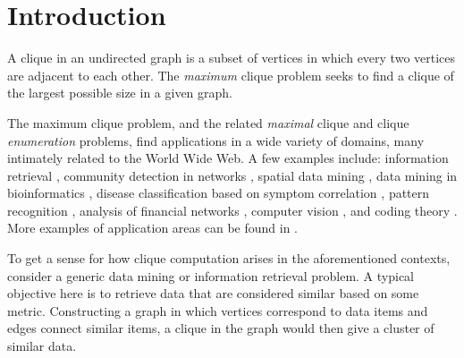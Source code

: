 \section{Introduction}
\label{sec:intro}

A clique in an undirected graph is a subset of vertices in which every two vertices
are adjacent to each other. The {\em maximum} clique problem seeks to find 
a clique of the largest possible size in a given graph.

The maximum clique problem, and the related {\em maximal} clique and 
clique {\em enumeration} problems, find applications in a wide variety of domains,
many intimately related to the World Wide Web. 
A few examples include:  
information retrieval \cite{Augustson:1970:AGT:321607.321608}, 
community detection in networks \cite{Fortunato_2010,cite-key,5586496}, 
spatial data mining \cite{wang2009order},
data mining in bioinformatics \cite{19566964},
disease classification based on symptom correlation \cite{Bonner:1964:CT:1662386.1662389}, 
pattern recognition \cite{1211348},
analysis of financial networks \cite{RePEc:eee:csdana:v:48:y:2005:i:2:p:431-443},
computer vision \cite{Horaud:1989:SCT:68871.68875}, and
coding theory \cite{brouwer}.
More examples of application areas can be found in 
\cite{Gutin2004,citeulike:4058448}.

To get a sense for how clique computation arises in the aforementioned contexts, 
consider a generic data mining or information retrieval problem. A typical objective
here is to retrieve data that are considered similar based on some metric. 
Constructing a graph in which vertices correspond to data items and 
edges connect similar items, a clique in the graph would then give a cluster of similar data. 


